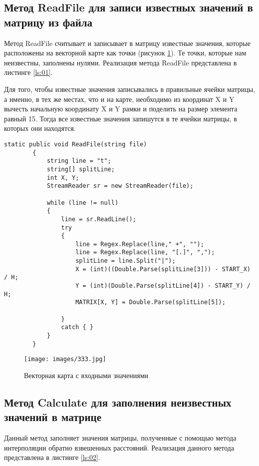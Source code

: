 \subsection{Метод ReadFile для записи известных значений в матрицу из файла}

Метод ReadFile считывает и записывает в матрицу известные значения, которые расположены на векторной карте как точки (рисунок \ref{fig:11}). Те точки, которые нам неизвестны, заполнены нулями. Реализация метода ReadFile представлена в листинге \ref{ls:01}.

Для того, чтобы известные значения записывались в правильные ячейки матрицы, а именно, в тех же местах, что и на карте, необходимо из координат X и Y вычесть начальную координату X и Y рамки и поделить на размер элемента равный 15. Тогда все известные значения запишутся в те ячейки матрицы, в которых они находятся.

\begin{lstlisting}[caption={Метод ReadFile}, label={ls:01}]
static public void ReadFile(string file)
        {
            string line = "t";
            string[] splitLine;
            int X, Y;
            StreamReader sr = new StreamReader(file);

            while (line != null)
            {
                line = sr.ReadLine();
                try
                {
                    line = Regex.Replace(line," +", "");
                    line = Regex.Replace(line, "[.]", ","); 
                    splitLine = line.Split("|");
                    X = (int)((Double.Parse(splitLine[3])) - START_X) / H;
                    Y = (int)(Double.Parse(splitLine[4]) - START_Y) / H;
                    MATRIX[X, Y] = Double.Parse(splitLine[5]);
                    
                }
                catch { }
            }
        }
\end{lstlisting}

\begin{figure}[h!]
    \center
    \texttt{[image: images/333.jpg]}
    \caption{Векторная карта с входными значениями}
    \label{fig:11}
\end{figure}


\subsection{Метод Calculate для заполнения неизвестных значений в матрице}

Данный метод заполняет значения матрицы, полученные с помощью метода интерполяции обратно взвешенных расстояний. Реализация данного метода представлена в листинге \ref{ls:02}.

